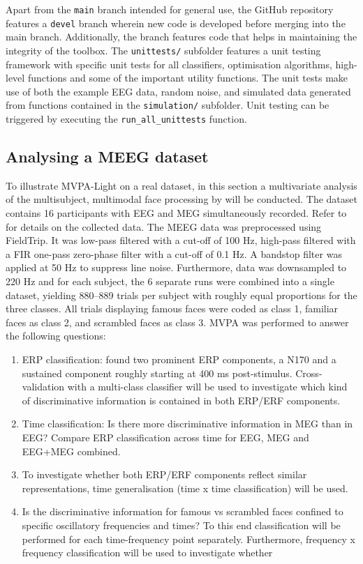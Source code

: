 \documentclass[utf8]{frontiersSCNS} %
\newcommand{\ttt}[1]{\texttt{#1}}
\begin{document}
Apart from the \ttt{main} branch intended for general use, the GitHub repository features a \ttt{devel} branch wherein new code is developed before merging into the main branch. Additionally, the branch features code that helps in maintaining the integrity of the toolbox. The \ttt{unittests/} subfolder features a unit testing framework with specific unit tests for all classifiers, optimisation algorithms, high-level functions and some of the important utility functions. The unit tests make use of both the example EEG data, random noise, and simulated data generated from functions contained in the \ttt{simulation/} subfolder. Unit testing can be triggered by executing the \ttt{run\_all\_unittests} function.

\subsection{Analysing a MEEG dataset}

To illustrate MVPA-Light on a real dataset, in this section a multivariate analysis of the multisubject, multimodal face processing by \citep{Wakeman2015ADataset,Wakeman2014OpenfMRI} will be conducted. The dataset contains 16 participants with EEG and MEG simultaneously recorded. Refer to  \cite{Wakeman2015ADataset} for details on the collected data. The MEEG data was preprocessed using FieldTrip. It was low-pass filtered with a cut-off of 100 Hz, high-pass filtered with a FIR one-pass zero-phase filter with a cut-off of 0.1 Hz. A bandstop filter was applied at 50 Hz to suppress line noise. Furthermore, data was downsampled to 220 Hz and for each subject, the 6 separate runs were combined into a single dataset, yielding 880--889 trials per subject with roughly equal proportions for the three classes. All trials displaying famous faces were coded as class 1, familiar faces as class 2, and scrambled faces as class 3. MVPA was performed to answer the following questions:

\begin{enumerate}
    \item ERP classification: \cite{Wakeman2015ADataset} found two prominent ERP components, a N170 and a sustained component roughly starting at 400 ms post-stimulus. Cross-validation with a multi-class classifier will be used to investigate which kind of discriminative information is contained in both ERP/ERF components.
    \item Time classification: Is there more discriminative information in MEG than in EEG? Compare ERP classification across time for EEG, MEG and EEG+MEG combined. 
    \item To investigate whether both ERP/ERF components reflect similar representations, time generalisation (time x time classification) will be used.
    \item Is the discriminative information for famous vs scrambled faces confined to specific oscillatory frequencies and times? To this end classification will be performed for each time-frequency point separately. Furthermore, frequency x frequency classification will be used to investigate whether 

\end{enumerate}
\end{document}

